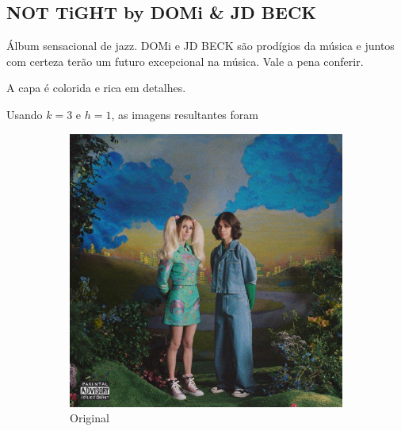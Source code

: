 \documentclass{article}
\begin{document}
\subsection{NOT TiGHT by DOMi \& JD BECK}
\label{subsec:nottight}

Álbum sensacional de jazz. DOMi e JD BECK são prodígios da música e
juntos com certeza terão um futuro excepcional na música. Vale a
pena conferir.

A capa é colorida e rica em detalhes.

Usando $k=3$ e $h=1$, as imagens resultantes foram
\clearpage
\begin{figure}[ht]
  \centering
  \begin{subfigure}{0.48\textwidth}
    \centering
    \includegraphics[width=\textwidth]{imagens-reais/not-tight/nottight.jpg}
    \caption{Original}
  \end{subfigure}%
  \hfill
  \begin{subfigure}{0.48\textwidth}
    \centering

\end{subfigure}
\end{figure}
\end{document}
